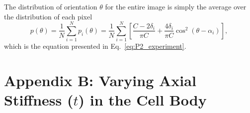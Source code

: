 \documentclass[]{interact}
\begin{document}
The distribution of orientation $\theta$ for the entire image is simply the average over the distribution of each pixel
%
\begin{equation}
p(\theta) = \frac{1}{N} \sum_{i=1}^N p_i(\theta) = \frac{1}{N} \sum_{i=1}^N \left[ \frac{C-2\delta_i}{\pi C} + \frac{4 \delta_i}{\pi C}\cos^2(\theta-\alpha_i) \right],
\end{equation}
%
which is the equation presented in Eq.\ \eqref{eq:P2_experiment}.

\section*{Appendix B: Varying Axial Stiffness ($t$) in the Cell Body}
\label{app:vary_t}
\end{document}
